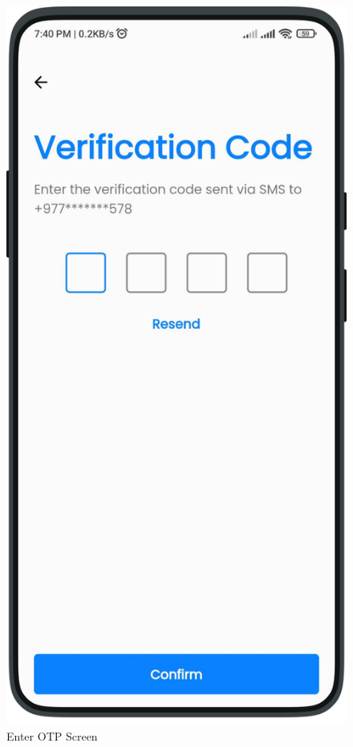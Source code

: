     \begin{multicols}{2}
        \begin{figure}[H]
        \centering
        \includegraphics[width=0.6\linewidth]{images/results/mobile/OTP.png}
        \caption[Enter OTP Screen ]{Enter OTP Screen}
        \label{fig:OTP.png}
        \end{figure}
           \begin{figure}[H]
        \centering

\end{figure}
\end{multicols}
